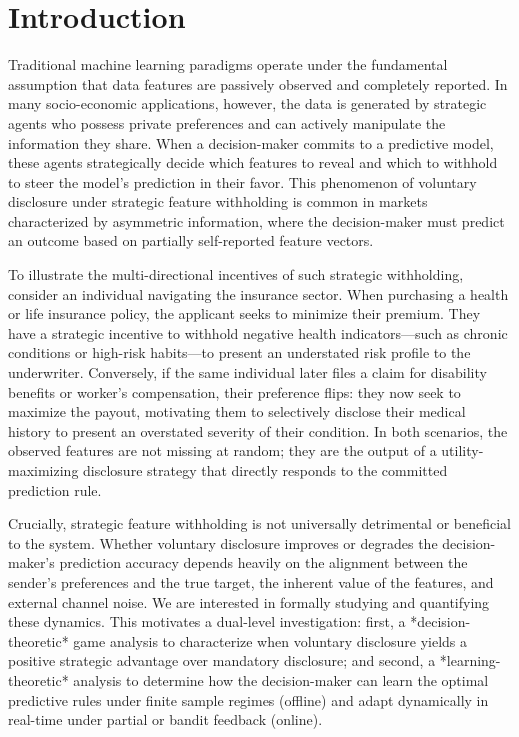\section{Introduction}
\label{sec:intro}

Traditional machine learning paradigms operate under the fundamental assumption that data features are passively observed and completely reported. In many socio-economic applications, however, the data is generated by strategic agents who possess private preferences and can actively manipulate the information they share. When a decision-maker commits to a predictive model, these agents strategically decide which features to reveal and which to withhold to steer the model's prediction in their favor. This phenomenon of voluntary disclosure under strategic feature withholding is common in markets characterized by asymmetric information, where the decision-maker must predict an outcome based on partially self-reported feature vectors.

To illustrate the multi-directional incentives of such strategic withholding, consider an individual navigating the insurance sector. When purchasing a health or life insurance policy, the applicant seeks to minimize their premium. They have a strategic incentive to withhold negative health indicators—such as chronic conditions or high-risk habits—to present an understated risk profile to the underwriter. Conversely, if the same individual later files a claim for disability benefits or worker's compensation, their preference flips: they now seek to maximize the payout, motivating them to selectively disclose their medical history to present an overstated severity of their condition. In both scenarios, the observed features are not missing at random; they are the output of a utility-maximizing disclosure strategy that directly responds to the committed prediction rule.

Crucially, strategic feature withholding is not universally detrimental or beneficial to the system. Whether voluntary disclosure improves or degrades the decision-maker's prediction accuracy depends heavily on the alignment between the sender's preferences and the true target, the inherent value of the features, and external channel noise. We are interested in formally studying and quantifying these dynamics. This motivates a dual-level investigation: first, a *decision-theoretic* game analysis to characterize when voluntary disclosure yields a positive strategic advantage over mandatory disclosure; and second, a *learning-theoretic* analysis to determine how the decision-maker can learn the optimal predictive rules under finite sample regimes (offline) and adapt dynamically in real-time under partial or bandit feedback (online). 

